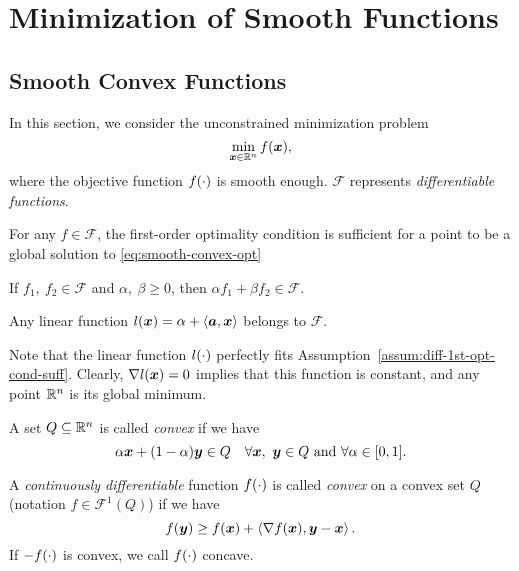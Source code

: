 \section{Minimization of Smooth Functions}\label{sect:minimization-of-smooth-functions}
\subsection{Smooth Convex Functions}\label{subsect:smooth-convex-functions}

In this section, we consider the unconstrained minimization problem
\begin{equation}\label{eq:smooth-convex-opt}
    \min_{\bm{x} \in \mathbb{R}^n} f(\bm{x}),
\end{equation}
where the objective function \(f(\cdot)\) is smooth enough. \(\mathscr{F}\) represents 
\emph{differentiable functions}.

\begin{assum}\label{assum:diff-1st-opt-cond-suff}
    For any \(f \in \mathscr{F}\), the first-order optimality condition is sufficient for a point
    to be a global solution to \ref{eq:smooth-convex-opt} 
\end{assum}

\begin{assum}\label{assum:diff-add}
    If \(f_1,~f_2 \in \mathscr{F}\) and \(\alpha,~\beta \ge 0\), then 
    \(\alpha f_1 + \beta f_2 \in \mathscr{F}\).
\end{assum}

\begin{assum}\label{assum:diff-linear}
    Any linear function \(l(\bm{x}) = \alpha + \left\langle \bm{a}, \bm{x} \right\rangle\) belongs to \(\mathscr{F}\).
\end{assum}
Note that the linear function \(l(\cdot)\) perfectly fits Assumption~\ref{assum:diff-1st-opt-cond-suff}.
Clearly, \(\nabla l(\bm{x}) = 0\) implies that this function is constant, and any point \(\mathbb{R}^n\) is its global
minimum.

\begin{defn}\label{defn:convex-set}
    A set \(Q \subseteq \mathbb{R}^n\) is called \emph{convex} if we have
    \[
        \alpha \bm{x} + (1 - \alpha) \bm{y} \in Q \quad 
        \forall \bm{x},~\bm{y} \in Q ~\text{and}~ \forall \alpha \in [0, 1]. 
    \]
\end{defn}

\begin{defn}\label{defn:convex-func}
    A \emph{continuously differentiable} function \(f(\cdot)\) is called \emph{convex} on a convex set
    \(Q\) (notation \(f \in \mathscr{F}^1(Q)\)) if we have
    \begin{equation}\label{eq:convex-func}
        f(\bm{y}) \ge f(\bm{x}) + \left\langle \nabla f(\bm{x}), \bm{y} - \bm{x} \right\rangle.  
    \end{equation}
    If \(-f(\cdot)\) is convex, we call \(f(\cdot)\) concave.
\end{defn}

